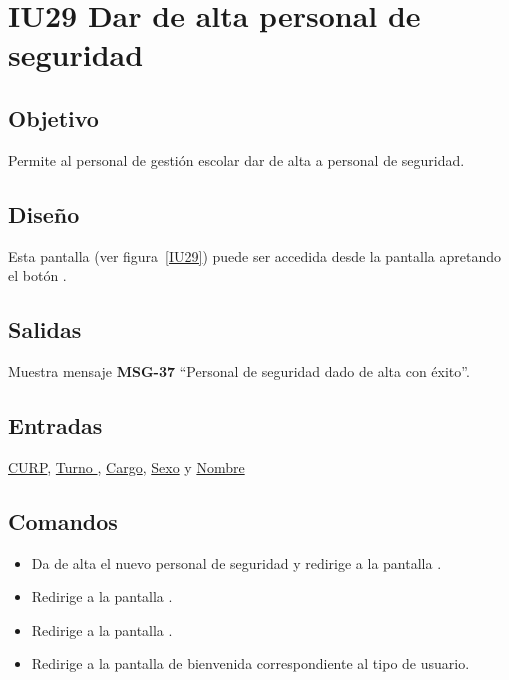 
\section{IU29 Dar de alta personal de seguridad}
\subsection{Objetivo}
    Permite al personal de gestión escolar dar de alta a personal de seguridad.
\subsection{Diseño}
    Esta pantalla  (ver figura~\ref{IU29}) puede ser accedida desde la pantalla  apretando el botón .

\subsection{Salidas}
Muestra mensaje {\bf MSG-37} ``Personal de seguridad dado de alta con éxito''.
\subsection{Entradas}
\hyperlink{Personal-de-seguridad.CURP }{CURP}, \hyperlink{personal-de-seguridad.Turno }{Turno }, \hyperlink{ Personal-de-seguridad.Cargo }{Cargo}, \hyperlink{ Personal-de-seguridad.Sexo}{Sexo} y \hyperlink{ Personal-de-seguridad.Nombre}{Nombre} 
\subsection{Comandos}
\begin{itemize}
    \item {} Da de alta el nuevo personal de seguridad y redirige a la pantalla .
    \item {} Redirige a la pantalla .
    \item {} Redirige a la pantalla .
    \item {} Redirige a la pantalla de bienvenida correspondiente al tipo de usuario.
    
\end{itemize}

